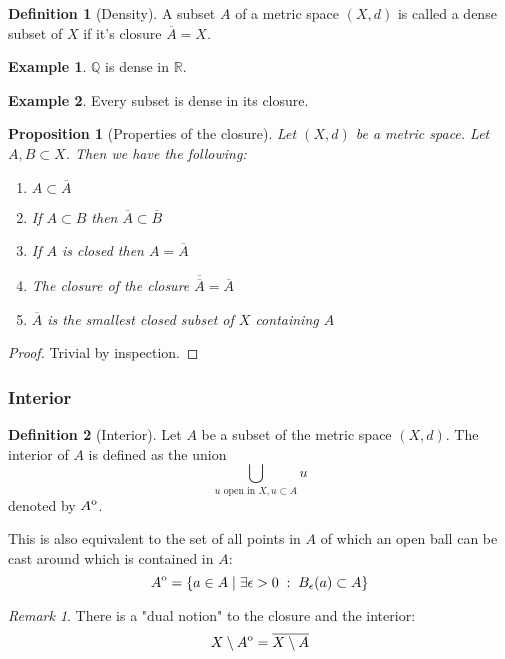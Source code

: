 \documentclass{article}
\theoremstyle{definition}
\newtheorem{defn}{Definition}[section]
\newtheorem{exmp}{Example}[section]
\theoremstyle{plain}%
\newtheorem{prop}[thm]{Proposition}
\theoremstyle{remark}
\newtheorem*{rem}{Remark}
\newcommand{\Union}{\bigcup}
\newcommand{\R}{\mathbb{R}}
\newcommand{\Q}{\mathbb{Q}}
\newcommand{\interior}[1]{%
  {\kern0pt#1}^{\mathrm{o}}%
}
\begin{document}
\begin{defn}[Density]
A subset $A$ of a metric space $(X,d)$ is called a dense subset of $X$ if it's closure $\overline{A} = X$.
\end{defn}

\begin{exmp}
$\Q$ is dense in $\R$.
\end{exmp}

\begin{exmp}
Every subset is dense in its closure.
\end{exmp}

\begin{prop}[Properties of the closure]
Let $(X,d)$ be a metric space. Let $A,B \subset X$. Then we have the following:
\begin{enumerate}
    \item $A \subset \overline{A}$
    \item If $A \subset B$ then $\overline{A} \subset \overline{B}$
    \item If $A$ is closed then $A = \overline{A}$
    \item The closure of the closure $\overline{\overline{A}} = \overline{A}$
    \item $\overline{A}$ is the smallest closed subset of $X$ containing $A$
\end{enumerate}
\end{prop}

\begin{proof}
Trivial by inspection.
\end{proof}

\subsubsection{Interior}

\begin{defn}[Interior]
Let $A$ be a subset of the metric space $(X, d)$. The interior of $A$ is defined as the union \[\Union_{u \text{ open in } X, u \subset A} u \] denoted by $\interior{A}$.

This is also equivalent to the set of all points in $A$ of which an open ball can be cast around which is contained in $A$:\[\interior{A} = \{a \in A \; | \; \exists \epsilon > 0 \; : \; B_{\epsilon}(a) \subset A\}\]
\end{defn}

\begin{rem}
There is a "dual notion" to the closure and the interior: \[X \setminus \interior{A} = \overline{X \setminus A}\]
\end{rem}
\end{document}
